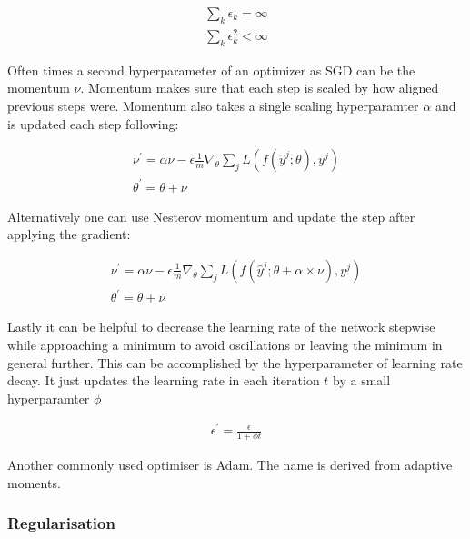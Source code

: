 \begin{align}
    \sum_k \epsilon_k = \infty\\
    \sum_k \epsilon_k^2 < \infty
\end{align}

Often times a second hyperparameter of an optimizer as SGD can be the momentum $\nu$. Momentum makes sure that each step is scaled  by how aligned previous steps were. Momentum also takes a single scaling hyperparamter $\alpha$ and is updated each step following:

\begin{align}
    \nu^{\prime} = \alpha \nu - \epsilon \frac{1}{m} \nabla_{\theta} \sum_j L(f(\hat{y}^j; \theta), y^j)\\
    \theta^{\prime} = \theta + \nu
\end{align}

Alternatively one can use Nesterov momentum and update the step after applying the gradient:

\begin{align}
    \nu^{\prime} = \alpha \nu - \epsilon \frac{1}{m} \nabla_{\theta} \sum_j L(f(\hat{y}^j; \theta + \alpha \times \nu), y^j)\\
    \theta^{\prime} = \theta + \nu
\end{align}

Lastly it can be helpful to decrease the learning rate of the network stepwise while approaching a minimum to avoid oscillations or leaving the minimum in general further. This can be accomplished by the hyperparameter of learning rate decay. It just updates the learning rate in each iteration $t$ by a small hyperparamter $\phi$

\begin{align}
    \epsilon^{\prime} = \frac{\epsilon}{1 + \phi t}
\end{align}

Another commonly used optimiser is Adam. The name is derived from adaptive moments.

\subsubsection{Regularisation}

